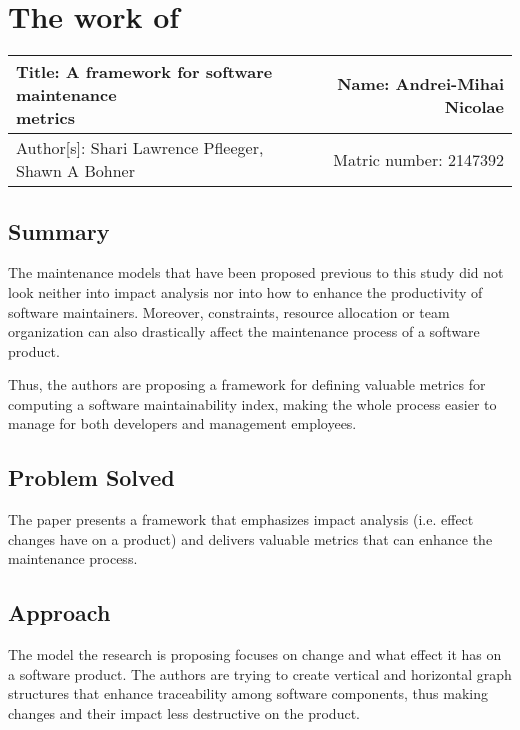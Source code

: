 \documentclass[a4paper,12pt]{article}
\begin{document}
\section{The work of \cite{pfleeger1990framework}}

 \begin{center}
   \begin{tabular}{ | l | r | }
    \hline
    \parbox[t]{5cm}{Title:  A framework for software maintenance
                    \\ metrics} 
     & Name: Andrei-Mihai Nicolae \\ 
     \hline
     \parbox[t]{5cm}{Author[s]: Shari Lawrence Pfleeger,
                    \\ Shawn A Bohner} 
      & Matric number: 2147392 \\
    \hline
   \end{tabular}
 \end{center}

\subsection{Summary}

The maintenance models that have been proposed previous to this study
did not look neither into impact analysis nor into how to enhance the
productivity of software maintainers. Moreover, constraints, resource
allocation or team organization can also drastically affect the
maintenance process of a software product. 

Thus, the authors are proposing a framework for defining valuable
metrics for computing a software maintainability index, making the
whole process easier to manage for both developers and management 
employees.

\subsection{Problem Solved}

The paper presents a framework that emphasizes impact analysis 
(i.e. effect changes have on a product) and delivers valuable 
metrics that can enhance the maintenance process.

\subsection{Approach}

The model the research is proposing focuses on change and what
effect it has on a software product. The authors are trying to 
create vertical and horizontal graph structures that enhance
traceability among software components, thus making changes and 
their impact less destructive on the product.
\end{document}
